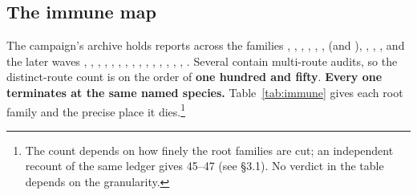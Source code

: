 \subsection{The immune map}

The campaign's archive holds reports across the families , ,
, , , ,  (and
), , , , and the later waves
, , , , ,
, , , , ,
, , , , ,
. Several contain multi-route audits, so the distinct-route count is on the
order of \textbf{one hundred and fifty}. \textbf{Every one terminates at the same named species.}
Table~\ref{tab:immune} gives each root family and the precise place it dies.\footnote{The count
depends on how finely the root families are cut; an independent recount of the same ledger gives
45--47 (see  \S3.1). No verdict in the table depends on the
granularity.}

